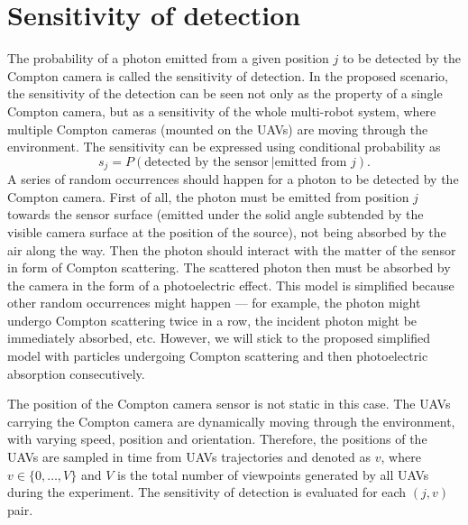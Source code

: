 
\section{Sensitivity of detection}%
\label{sec:sensitivity}
The probability of a photon emitted from a given position $j$ to be detected by the Compton camera is called the sensitivity of detection.
In the proposed scenario, the sensitivity of the detection can be seen not only as the property of a single Compton camera, but as a sensitivity of the whole multi-robot system, where multiple Compton cameras (mounted on the \ac{UAV}s) are moving through the environment.
The sensitivity can be expressed using conditional probability as 
\begin{equation}
  s_{j} =  P(\textrm{detected by the sensor}\ | \textrm{emitted from } j).
\end{equation}
A series of random occurrences should happen for a photon to be detected by the Compton camera.
First of all, the photon must be emitted from position $j$ towards the sensor surface (emitted under the solid angle subtended by the visible camera surface at the position of the source), not being absorbed by the air along the way.
Then the photon should interact with the matter of the sensor in form of Compton scattering.
The scattered photon then must be absorbed by the camera in the form of a photoelectric effect.
This model is simplified because other random occurrences might happen --- for example, the photon might undergo Compton scattering twice in a row, the incident photon might be immediately absorbed, etc.
However, we will stick to the proposed simplified model with particles undergoing Compton scattering and then photoelectric absorption consecutively.

The position of the Compton camera sensor is not static in this case. 
The \ac{UAV}s carrying the Compton camera are dynamically moving through the environment, with varying speed, position and orientation.
Therefore, the positions of the \ac{UAV}s are sampled in time from \ac{UAV}s trajectories and denoted as $v$, where $v \in \{0, \dots , V\}$ and $V$ is the total number of viewpoints generated by all \ac{UAV}s during the experiment.
The sensitivity of detection is evaluated for each $(j,v)$ pair. %

